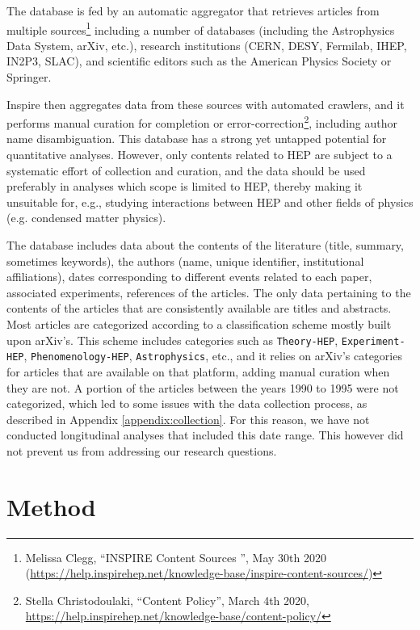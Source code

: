\documentclass[smallextended]{svjour3}
\begin{document}
The database is fed by an automatic aggregator that retrieves articles from multiple sources\footnote{Melissa Clegg, ``INSPIRE Content Sources
'', May 30th 2020 (\url{https://help.inspirehep.net/knowledge-base/inspire-content-sources/})} including a number of databases (including the Astrophysics Data System, arXiv, etc.), research institutions (CERN, DESY, Fermilab, IHEP, IN2P3, SLAC), and scientific editors such as the American Physics Society or Springer.

Inspire then aggregates data from these sources with automated crawlers, and it performs manual curation for completion or error-correction\footnote{Stella Christodoulaki, ``Content Policy'', March 4th 2020, \url{https://help.inspirehep.net/knowledge-base/content-policy/}}, including author name disambiguation. This database has a strong yet untapped potential for quantitative analyses. However, only contents related to HEP are subject to a systematic effort of collection and curation, and the data should be used preferably in analyses which scope is limited to HEP, thereby making it unsuitable for, e.g., studying interactions between HEP and other fields of physics (e.g. condensed matter physics).%

The database includes data about the contents of the literature (title, summary, sometimes keywords), the authors (name, unique identifier, institutional affiliations), dates corresponding to different events related to each paper, associated experiments, references of the articles. The only data pertaining to the contents of the articles that are consistently available are titles and abstracts. Most articles are categorized according to a classification scheme mostly built upon arXiv's. This scheme includes categories such as \texttt{Theory-HEP}, \texttt{Experiment-HEP}, \texttt{Phenomenology-HEP}, \texttt{Astrophysics}, etc., and it relies on arXiv's categories for articles that are available on that platform, adding manual curation when they are not. A portion of the articles between the years 1990 to 1995 were not categorized, which led to some issues with the data collection process, as described in Appendix \ref{appendix:collection}. For this reason, we have not conducted longitudinal analyses that included this date range. This however did not prevent us from addressing our research questions.

\section{Method}\label{section:method}
\end{document}

